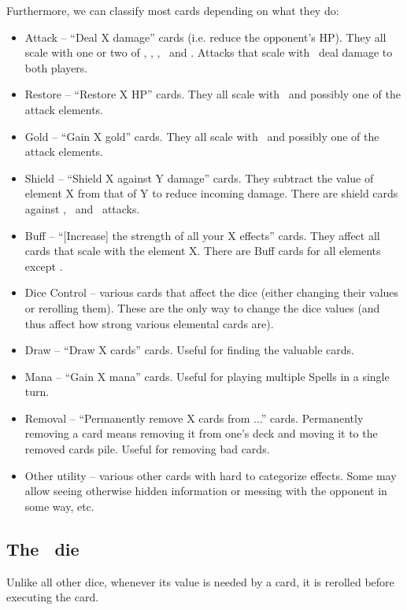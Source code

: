 \documentclass[dvipsnames,parskip,a4paper]{scrartcl}
\newcommand{\iconsize}{3.4mm}
\newcommand{\icondepth}{0.45mm}
\newcommand{\icon}[1]{\raisebox{-\icondepth}{\texttt{[image:  \#1 ]}}}
\newcommand{\fire}{\icon{icons/fire.png}}
\newcommand{\earth}{\icon{icons/earth.png}}
\newcommand{\water}{\icon{icons/water.png}}
\newcommand{\nature}{\icon{icons/nature.png}}
\newcommand{\magic}{\icon{icons/magic.png}}
\newcommand{\gold}{\icon{icons/gold.png}}
\newcommand{\chance}{\icon{icons/chance.png}}
\begin{document}
Furthermore, we can classify most cards depending on what they do:

\begin{itemize}
\item Attack -- ``Deal X damage'' cards (i.e. reduce the opponent's HP). They all scale with one or two of \fire, \earth, \water, \chance \ and \magic. Attacks that scale with \water \ deal damage to both players.
\item Restore -- ``Restore X HP'' cards. They all scale with \nature \ and possibly one of the attack elements.
\item Gold -- ``Gain X gold'' cards. They all scale with \gold \ and possibly one of the attack elements.
\item Shield -- ``Shield X against Y damage'' cards. They subtract the value of element X from that of Y to reduce incoming damage. There are shield cards against \fire, \earth \ and \water \ attacks.
\item Buff -- ``[Increase] the strength of all your X effects'' cards. They affect all cards that scale with the element X. There are Buff cards for all elements except \chance.
\item Dice Control -- various cards that affect the dice (either changing their values or rerolling them). These are the only way to change the dice values (and thus affect how strong various elemental cards are).
\item Draw -- ``Draw X cards'' cards. Useful for finding the valuable cards.
\item Mana -- ``Gain X mana'' cards. Useful for playing multiple Spells in a single turn.
\item Removal -- ``Permanently remove X cards from ...'' cards. Permanently removing a card means removing it from one's deck and moving it to the removed cards pile. Useful for removing bad cards.
\item Other utility -- various other cards with hard to categorize effects. Some may allow seeing otherwise hidden information or messing with the opponent in some way, etc.
\end{itemize}

\subsection*{The \chance \ die}

Unlike all other dice, whenever its value is needed by a card, it is rerolled before executing the card.
\end{document}
